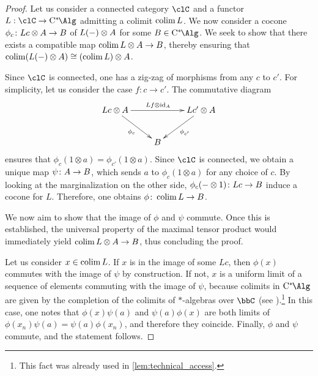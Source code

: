 \begin{proof}
	Let us consider a connected category $\clC$ and a functor $L:\clC\to \Calg$ admitting a colimit $\operatorname{colim} L$.
	We now consider a cocone $\phi_c \colon Lc\otimes {A} \to {B}$ of $L(-)\otimes {A}$ for some $\B\in \Calg$.
	We seek to show that there exists a compatible map $\operatorname{colim} L \otimes {A}\to {B}$, thereby ensuring that $\operatorname{colim}(L(-)\otimes A)\cong (\operatorname{colim} L)\otimes A$.

	Since $\clC$ is connected, one has a zig-zag of morphisms from any $c$ to $c'$.
	For simplicity, let us consider the case $f\colon c\to c'$.
	The commutative diagram
	\[
		\xymatrix{
		Lc\otimes \A \ar[rr]^{Lf \otimes \id_{\A}} \ar[dr]_{\phi_c}
		&&
		Lc'\otimes \A \ar[dl]^{\phi_{c'}}
		\\
		&
		\B
		&
		}
	\]
	ensures that $\phi_c(1\otimes a) = \phi_{c'}(1\otimes a)$.
	Since $\clC$ is connected, we obtain a unique map $\psi\colon {A} \to {B}$, which sends $a$ to $\phi_{c}(1\otimes a)$ for any choice of $c$.
	By looking at the marginalization on the other side, $\phi_c(-\otimes 1)\colon Lc\to {B}$ induce a cocone for $L$. Therefore, one obtains $\phi\colon \operatorname{colim} L \to {B}$.

	We now aim to show that the image of $\phi$ and $\psi$ commute. Once this is established, the universal property of the maximal tensor product would immediately yield $\operatorname{colim} L \otimes {A} \to {B}$, thus concluding the proof.

	Let us consider $x\in \operatorname{colim} L$. If $x$ is in the image of some $Lc$, then $\phi(x)$ commutes with the image of $\psi$ by construction.
	If not, $x$ is a uniform limit of a sequence of elements commuting with the image of $\psi$, because colimits in $\Calg$ are given by the completion of the colimits of $*$-algebras over $\bbC$ (see \cite[Corollaries 7.22 and 7.23]{bunke2021lectures}).\footnote{This fact was already used in \cref{lem:technical_access}.}
	In this case, one notes that $\phi(x)\psi(a)$ and $\psi(a)\phi(x)$ are both limits of $\phi(x_n)\psi(a)=\psi(a)\phi(x_n)$, and therefore they coincide.
	Finally, $\phi$ and $\psi$ commute, and the statement follows.
\end{proof}


